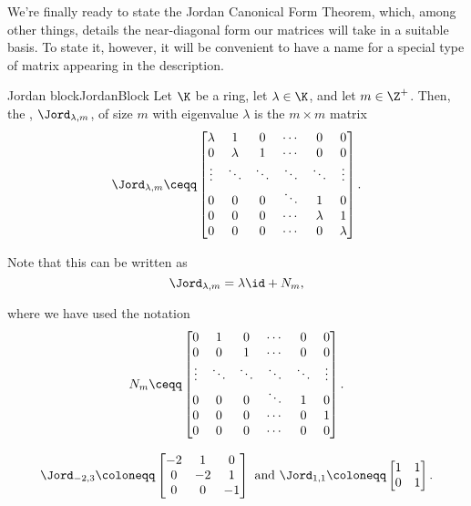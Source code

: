 We're finally ready to state the Jordan Canonical Form Theorem, which, among other things, details the near-diagonal form our matrices will take in a suitable basis.  To state it, however, it will be convenient to have a name for a special type of matrix appearing in the description.
\begin{dfn}{Jordan block}{JordanBlock}
	Let $\K$ be a ring, let $\lambda \in \K$, and let $m\in \Z ^+$.  Then, the , $\Jord _{\lambda ,m}$, of size $m$ with eigenvalue $\lambda$ is the $m\times m$ matrix
	\begin{equation}
	\Jord _{\lambda ,m}\ceqq \begin{bmatrix}\lambda & 1 & 0 & \cdots & 0& 0 \\ 0 & \lambda & 1 & \cdots & 0 & 0 \\ \vdots & \ddots & \ddots & \ddots & \ddots & \vdots \\ 0 & 0 & 0 & \ddots & 1 & 0 \\ 0 & 0 & 0 & \cdots & \lambda & 1 \\ 0 & 0 & 0 & \cdots & 0 & \lambda\end{bmatrix}.
	\end{equation}
	\begin{rmk}
		Note that this can be written as
		\begin{equation}
		\Jord _{\lambda ,m}=\lambda \id +N_m,
		\end{equation}
	\end{rmk}
	where we have used the notation
	\begin{equation}
	N_m\ceqq \begin{bmatrix}0 & 1 & 0 & \cdots & 0 & 0 \\ 0 & 0 & 1 & \cdots & 0 & 0 \\ \vdots & \ddots & \ddots & \ddots & \ddots & \vdots \\ 0 & 0 & 0 & \ddots & 1 & 0 \\ 0 & 0 & 0 & \cdots & 0 & 1 \\ 0 & 0 & 0 & \cdots & 0 & 0\end{bmatrix}.
	\end{equation}
\end{dfn}
\begin{exm}{}{}
	\begin{equation}
		\Jord _{-2,3}\coloneqq \begin{bmatrix}-2 & 1 & 0 \\ 0 & -2 & 1 \\ 0 & 0 & -1\end{bmatrix}\text{ and } \Jord _{1,1}\coloneqq \begin{bmatrix}1 & 1 \\ 0 & 1\end{bmatrix}.
	\end{equation}
\end{exm}
